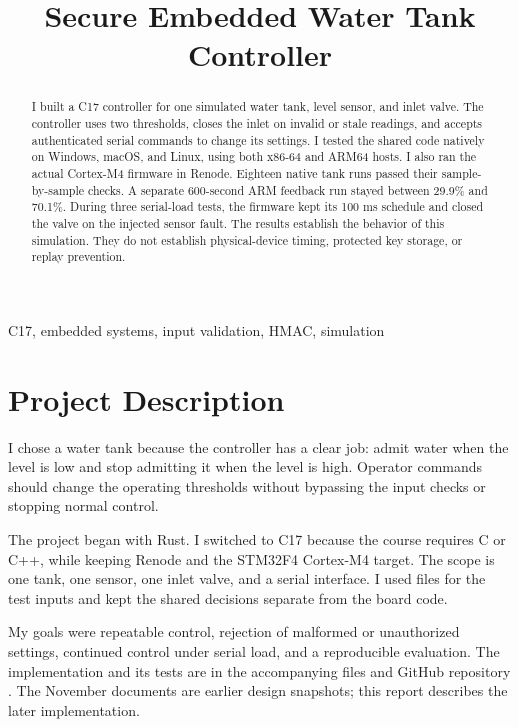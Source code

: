 \documentclass[conference]{IEEEtran}
\begin{document}
\title{Secure Embedded Water Tank Controller}
\author{}
\maketitle
\begin{abstract}
I built a C17 controller for one simulated water tank, level sensor, and inlet valve. The controller uses two thresholds, closes the inlet on invalid or stale readings, and accepts authenticated serial commands to change its settings. I tested the shared code natively on Windows, macOS, and Linux, using both x86-64 and ARM64 hosts. I also ran the actual Cortex-M4 firmware in Renode. Eighteen native tank runs passed their sample-by-sample checks. A separate 600-second ARM feedback run stayed between 29.9\% and 70.1\%. During three serial-load tests, the firmware kept its 100 ms schedule and closed the valve on the injected sensor fault. The results establish the behavior of this simulation. They do not establish physical-device timing, protected key storage, or replay prevention.
\end{abstract}
\begin{IEEEkeywords}
C17, embedded systems, input validation, HMAC, simulation
\end{IEEEkeywords}

\section{Project Description}
I chose a water tank because the controller has a clear job: admit water when the level is low and stop admitting it when the level is high. Operator commands should change the operating thresholds without bypassing the input checks or stopping normal control.

The project began with Rust. I switched to C17 because the course requires C or C++, while keeping Renode and the STM32F4 Cortex-M4 target. The scope is one tank, one sensor, one inlet valve, and a serial interface. I used files for the test inputs and kept the shared decisions separate from the board code.

My goals were repeatable control, rejection of malformed or unauthorized settings, continued control under serial load, and a reproducible evaluation. The implementation and its tests are in the accompanying files and GitHub repository \cite{repo}. The November documents are earlier design snapshots; this report describes the later implementation.
\end{document}
